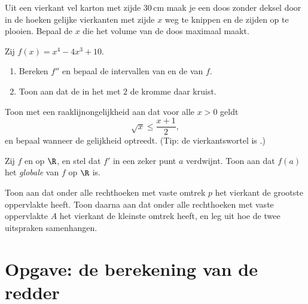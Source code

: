 \begin{exercise}[$\star\star$]\label{exo:g12:deriv:5}
Uit een vierkant vel karton met zijde $30\,$cm maak je een doos zonder
deksel door in de hoeken gelijke vierkanten met zijde $x$ weg te knippen en
de zijden op te plooien. Bepaal de $x$ die het volume van de doos maximaal
maakt.
\end{exercise}

\begin{exercise}[$\star\star$]\label{exo:g12:deriv:6}
Zij $f(x) = x^4 - 4x^3 + 10$.
\begin{enumerate}
  \item Bereken $f''$ en bepaal de intervallen van  en de
         van $f$.
  \item Toon aan dat de  in het  met  $2$ de kromme
        daar kruist.
\end{enumerate}
\end{exercise}

\begin{exercise}[$\star\star$]\label{exo:g12:deriv:7}
Toon met een raaklijnongelijkheid aan dat voor alle $x > 0$ geldt
\[
\sqrt{x} \leq \frac{x + 1}{2},
\]
en bepaal wanneer de gelijkheid optreedt. (Tip: de vierkantswortel is
.)
\end{exercise}

\begin{exercise}[$\star\star\star$]\label{exo:g12:deriv:8}
Zij $f$  en  op $\R$, en stel dat $f'$ in een zeker
punt $a$ verdwijnt. Toon aan dat $f(a)$ het \emph{globale}  van $f$ op
$\R$ is.
\end{exercise}

\begin{exercise}[$\star\star\star$]\label{exo:g12:deriv:9}
Toon aan dat onder alle rechthoeken met vaste omtrek $p$ het vierkant de
grootste oppervlakte heeft. Toon daarna aan dat onder alle rechthoeken met
vaste oppervlakte $A$ het vierkant de kleinste omtrek heeft, en leg uit hoe
de twee uitspraken samenhangen.
\end{exercise}

\section{Opgave: de berekening van de redder}

